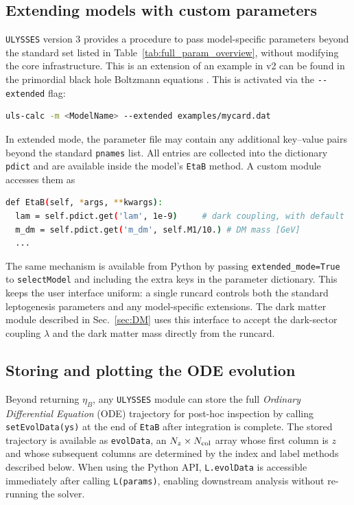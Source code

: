 \documentclass[12pt, a4paper]{article}
\begin{document}
\subsection{Extending models with custom parameters}
\label{ssec:extended}
\texttt{ULYSSES} version 3 provides a procedure to pass model-specific parameters beyond the standard set listed in Table~\ref{tab:full_param_overview}, without modifying the core infrastructure. This is an extension of an example in v2 \cite{Granelli:2023vcm} can be found in the primordial black hole Boltzmann equations \cite{Cheek:2021odj,Cheek:2021cfe}. This is activated via the \texttt{-{}-extended} flag: 
\begin{lstlisting}[language = bash]
uls-calc -m <ModelName> --extended examples/mycard.dat
\end{lstlisting}
In extended mode, the parameter file may contain any additional key--value pairs beyond the standard \texttt{pnames} list. All entries are collected into the dictionary \texttt{pdict} and are available inside the model's \texttt{EtaB} method. A custom module accesses them as
\begin{lstlisting}[language = bash]
def EtaB(self, *args, **kwargs):
  lam = self.pdict.get('lam', 1e-9)     # dark coupling, with default
  m_dm = self.pdict.get('m_dm', self.M1/10.) # DM mass [GeV]
  ...
\end{lstlisting}
The same mechanism is available from Python by passing \texttt{extended\_mode=True} to \texttt{selectModel} and including the extra keys in the parameter dictionary. This keeps the user interface uniform: a single runcard controls both the standard leptogenesis parameters and any model-specific extensions. The dark matter module described in Sec.~\ref{sec:DM} uses this interface to accept the dark-sector coupling $\lambda$ and the dark matter mass directly from the runcard.
\subsection{Storing and plotting the ODE evolution}
\label{ssec:plots}

Beyond returning $\eta_B$, any \texttt{ULYSSES} module can store the full \emph {Ordinary Differential Equation} (ODE) trajectory for post-hoc inspection by calling \texttt{setEvolData(ys)} at the end of \texttt{EtaB} after integration is complete. The stored trajectory is available as \texttt{evolData}, an $N_z \times N_{\rm col}$ array whose first column is $z$ and whose subsequent columns are determined by the index and label methods described below. When using the Python API, \texttt{L.evolData} is accessible immediately after calling \texttt{L(params)}, enabling downstream analysis without re-running the solver.
\end{document}
